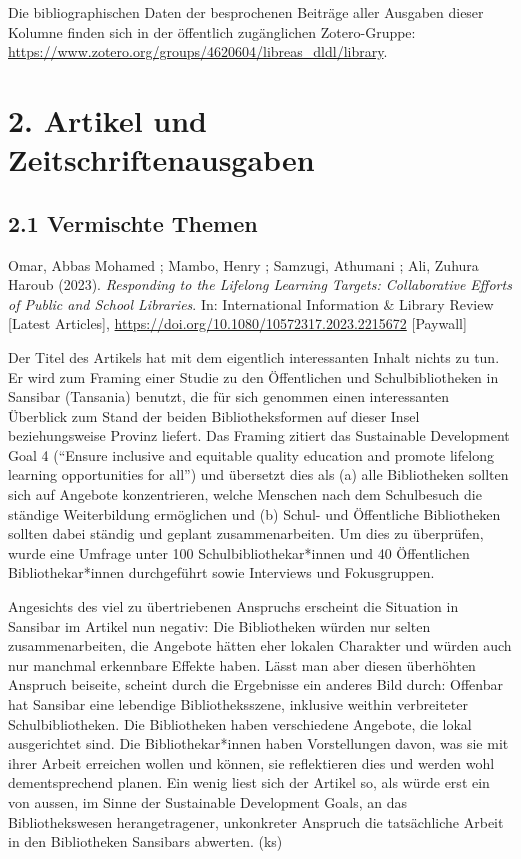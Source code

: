 \documentclass[a4paper,
fontsize=11pt,
oneside,
numbers=noperiodatend,
parskip=half-,
bibliography=totoc,
final
]{scrartcl}
\begin{document}
Die bibliographischen Daten der besprochenen Beiträge aller Ausgaben
dieser Kolumne finden sich in der öffentlich zugänglichen Zotero-Gruppe:
\url{https://www.zotero.org/groups/4620604/libreas_dldl/library}.

\hypertarget{artikel-und-zeitschriftenausgaben}{%
\section{2. Artikel und
Zeitschriftenausgaben}\label{artikel-und-zeitschriftenausgaben}}

\hypertarget{vermischte-themen}{%
\subsection{2.1 Vermischte Themen}\label{vermischte-themen}}

Omar, Abbas Mohamed ; Mambo, Henry ; Samzugi, Athumani ; Ali, Zuhura
Haroub (2023). \emph{Responding to the Lifelong Learning Targets:
Collaborative Efforts of Public and School Libraries}. In: International
Information \& Library Review {[}Latest Articles{]},
\url{https://doi.org/10.1080/10572317.2023.2215672} {[}Paywall{]}

Der Titel des Artikels hat mit dem eigentlich interessanten Inhalt
nichts zu tun. Er wird zum Framing einer Studie zu den Öffentlichen und
Schulbibliotheken in Sansibar (Tansania) benutzt, die für sich genommen
einen interessanten Überblick zum Stand der beiden Bibliotheksformen auf
dieser Insel beziehungsweise Provinz liefert. Das Framing zitiert das
Sustainable Development Goal 4 (\enquote{Ensure inclusive and equitable
quality education and promote lifelong learning opportunities for all})
und übersetzt dies als (a) alle Bibliotheken sollten sich auf Angebote
konzentrieren, welche Menschen nach dem Schulbesuch die ständige
Weiterbildung ermöglichen und (b) Schul- und Öffentliche Bibliotheken
sollten dabei ständig und geplant zusammenarbeiten. Um dies zu
überprüfen, wurde eine Umfrage unter 100 Schulbibliothekar*innen und 40
Öffentlichen Bibliothekar*innen durchgeführt sowie Interviews und
Fokusgruppen.

Angesichts des viel zu übertriebenen Anspruchs erscheint die Situation
in Sansibar im Artikel nun negativ: Die Bibliotheken würden nur selten
zusammenarbeiten, die Angebote hätten eher lokalen Charakter und würden
auch nur manchmal erkennbare Effekte haben. Lässt man aber diesen
überhöhten Anspruch beiseite, scheint durch die Ergebnisse ein anderes
Bild durch: Offenbar hat Sansibar eine lebendige Bibliotheksszene,
inklusive weithin verbreiteter Schulbibliotheken. Die Bibliotheken haben
verschiedene Angebote, die lokal ausgerichtet sind. Die
Bibliothekar*innen haben Vorstellungen davon, was sie mit ihrer Arbeit
erreichen wollen und können, sie reflektieren dies und werden wohl
dementsprechend planen. Ein wenig liest sich der Artikel so, als würde
erst ein von aussen, im Sinne der Sustainable Development Goals, an das
Bibliothekswesen herangetragener, unkonkreter Anspruch die tatsächliche
Arbeit in den Bibliotheken Sansibars abwerten. (ks)
\end{document}

